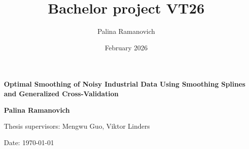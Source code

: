 \documentclass[11pt,leqno]{book}
\title{Bachelor project VT26}
\author{Palina Ramanovich}
\date{February 2026}
\theoremstyle{definition}
\theoremstyle{plain}
\theoremstyle{definition}
\begin{document}
\begin{titlepage}
   \begin{center}
       \vspace*{1cm}

       \textbf{\Large{Optimal Smoothing of Noisy Industrial Data Using Smoothing Splines and Generalized Cross-Validation}}

       \vspace{0.5cm}
            
       \vspace{1.5cm}

       \textbf{\large{Palina Ramanovich}}

       \vfill
            
       \large{Thesis supervisors: Mengwu Guo, Viktor Linders}
            
       \vspace{0.8cm}
     
       
            
       Date: \today
   \end{center}
\end{titlepage}
\let\cleardoublepage\clearpage
\end{document}

